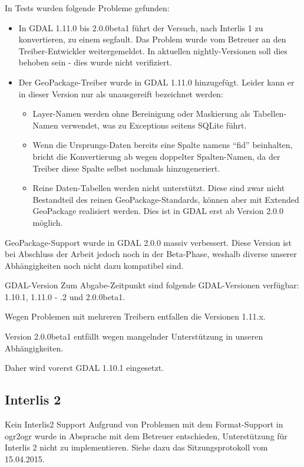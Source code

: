 In Tests wurden folgende Probleme gefunden:
\begin{itemize}
\item In GDAL 1.11.0 bis 2.0.0beta1 führt der Versuch, nach Interlis 1 zu konvertieren, zu einem \gls{segfault}. Das Problem wurde vom Betreuer an den Treiber-Entwickler weitergemeldet. In aktuellen nightly-Versionen soll dies behoben sein - dies wurde nicht verifiziert.
\item Der GeoPackage-Treiber wurde in GDAL 1.11.0 hinzugefügt. Leider kann er in dieser Version nur als unausgereift bezeichnet werden:
  \begin{itemize}
  \item Layer-Namen werden ohne Bereinigung oder Maskierung als Tabellen-Namen verwendet, was zu Exceptions seitens SQLite führt.
  \item Wenn die Ursprungs-Daten bereits eine Spalte namens ``fid'' beinhalten, bricht die Konvertierung ab wegen doppelter Spalten-Namen, da der Treiber diese Spalte selbst nochmals hinzugeneriert.
  \item Reine Daten-Tabellen werden nicht unterstützt. Diese sind zwar nicht Bestandteil des reinen GeoPackage-Standards, können aber mit Extended GeoPackage realisiert werden. Dies ist in GDAL erst ab Version 2.0.0 möglich.
  \end{itemize}
\end{itemize}

GeoPackage-Support wurde in GDAL 2.0.0 massiv verbessert. Diese Version ist bei Abschluss der Arbeit jedoch noch in der Beta-Phase, weshalb diverse unserer Abhängigkeiten noch nicht dazu kompatibel sind.

\begin{decision}[label=dec:pd:gdal-version]{GDAL-Version}
Zum Abgabe-Zeitpunkt sind folgende GDAL-Versionen verfügbar: 1.10.1, 1.11.0 - .2 und 2.0.0beta1.

Wegen Problemen mit mehreren Treibern entfallen die Versionen 1.11.x.

Version 2.0.0beta1 entfällt wegen mangelnder Unterstützung in unseren Abhängigkeiten.

Daher wird vorerst GDAL 1.10.1 eingesetzt.
\end{decision}

\subsection{Interlis 2}
\begin{decision}[label=dec:pd:no_interlis2]{Kein Interlis2 Support}
Aufgrund von Problemen mit dem Format-Support in ogr2ogr wurde in Absprache mit dem Betreuer entschieden, Unterstützung für Interlis 2 nicht zu implementieren. Siehe dazu das Sitzungsprotokoll vom 15.04.2015.
\end{decision}
